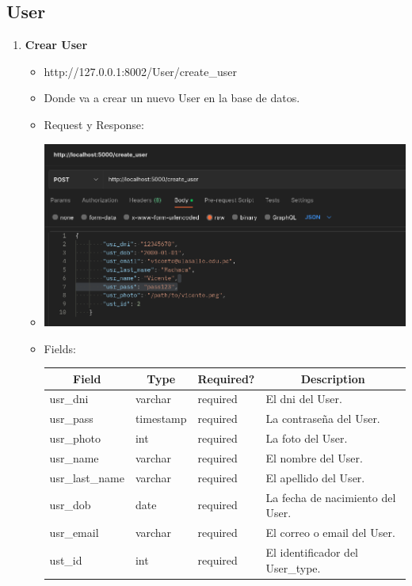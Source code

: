 \documentclass{article}
\begin{document}
\subsection{User}
\begin{enumerate}
    \item \textbf{Crear User}
    \begin{itemize}
        \item http://127.0.0.1:8002/User/create\_user
        \item Donde va a crear un nuevo User en la base de datos.
        \item Request y Response:
        \item \includegraphics[scale=.5]{assets/user/create_user.png}
        \item Fields:
        \begin{table}[H] \centering \begin{tabular}{|l|l|l|l|} \hline
        \multicolumn{1}{|c|}{\textbf{Field}} &
        \multicolumn{1}{c|}{\textbf{Type}} &
        \multicolumn{1}{c|}{\textbf{Required?}} &
        \multicolumn{1}{c|}{\textbf{Description}} \\ \hline usr\_dni & varchar &
        required & El dni del User. \\ \hline usr\_pass & timestamp & required &
        La contraseña del User. \\ \hline usr\_photo & int & required & La foto
        del User. \\ \hline usr\_name & varchar & required & El nombre del User.
        \\ \hline usr\_last\_name & varchar & required & El apellido del User.
        \\ \hline usr\_dob & date & required & La fecha de nacimiento del User.
        \\ \hline usr\_email & varchar & required & El correo o email del User.
        \\ \hline ust\_id & int & required & El identificador del User\_type. \\

\end{tabular}
\end{table}
\end{itemize}
\end{enumerate}
\end{document}
